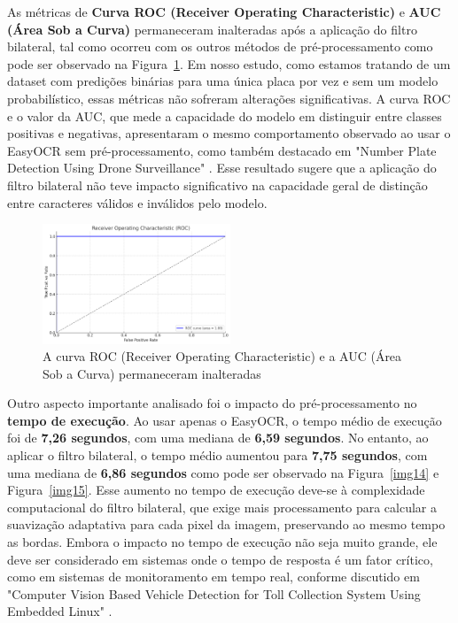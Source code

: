 \documentclass[conference]{IEEEtran}
\begin{document}
As métricas de \textbf{Curva ROC (Receiver Operating Characteristic)} e \textbf{AUC (Área Sob a Curva)} permaneceram inalteradas após a aplicação do filtro bilateral, tal como ocorreu com os outros métodos de pré-processamento como pode ser observado na Figura~\ref{img13}. Em nosso estudo, como estamos tratando de um dataset com predições binárias para uma única placa por vez e sem um modelo probabilístico, essas métricas não sofreram alterações significativas. A curva ROC e o valor da AUC, que mede a capacidade do modelo em distinguir entre classes positivas e negativas, apresentaram o mesmo comportamento observado ao usar o EasyOCR sem pré-processamento, como também destacado em "Number Plate Detection Using Drone Surveillance" \cite{b15}. Esse resultado sugere que a aplicação do filtro bilateral não teve impacto significativo na capacidade geral de distinção entre caracteres válidos e inválidos pelo modelo.


\begin{figure}[htbp]
	\centerline{\includegraphics[width=0.5\textwidth]{img13.png}}
	\caption{A curva ROC (Receiver Operating Characteristic) e a AUC (Área Sob a Curva) permaneceram inalteradas }
	\label{img13}
\end{figure}



Outro aspecto importante analisado foi o impacto do pré-processamento no \textbf{tempo de execução}. Ao usar apenas o EasyOCR, o tempo médio de execução foi de \textbf{7,26 segundos}, com uma mediana de \textbf{6,59 segundos}. No entanto, ao aplicar o filtro bilateral, o tempo médio aumentou para \textbf{7,75 segundos}, com uma mediana de \textbf{6,86 segundos} como pode ser observado na Figura~\ref{img14} e Figura~\ref{img15}. Esse aumento no tempo de execução deve-se à complexidade computacional do filtro bilateral, que exige mais processamento para calcular a suavização adaptativa para cada pixel da imagem, preservando ao mesmo tempo as bordas. Embora o impacto no tempo de execução não seja muito grande, ele deve ser considerado em sistemas onde o tempo de resposta é um fator crítico, como em sistemas de monitoramento em tempo real, conforme discutido em "Computer Vision Based Vehicle Detection for Toll Collection System Using Embedded Linux" \cite{b16}.
\end{document}

